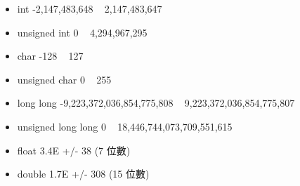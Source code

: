 \begin{itemize}
    \item int                 -2,147,483,648 ~ 2,147,483,647
    \item unsigned int	    0 ~ 4,294,967,295
    \item char                -128 ~ 127
    \item unsigned char       0 ~ 255
    \item long long           -9,223,372,036,854,775,808 ~ 9,223,372,036,854,775,807
    \item unsigned long long  0 ~ 18,446,744,073,709,551,615
    \item float               3.4E +/- 38 (7 位數)
    \item double              1.7E +/- 308 (15 位數)
    \end{itemize}